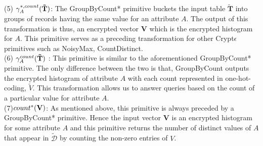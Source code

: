 (5) $\gamma^{*,count}_{A}(\mathbf{\tilde{T}})$: The  \textsf{GroupByCount*} primitive buckets the input table $\mathbf{\tilde{T}}$ into groups of records having the same value for an attribute $A$. The output of this transformation is thus, an encrypted  vector $\mathbf{V}$ which is the encrypted histogram for $A$.
    This primitive serves as a preceding transformation for other Crypt$\epsilon$ primitives such as \textsf{NoisyMax}, \textsf{CountDistinct}.\\
(6) $\gamma^{count}_{A}(\mathbf{\tilde{T}})$ : This primitive is similar to the aforementioned \textsf{GroupByCount*} primitive. The only difference between the two is that, \textsf{GroupByCount} outputs the encrypted histogram of attribute $A$ with each count represented in one-hot-coding, $\tilde{V}$.  This transformation allows us to answer queries based on the count of a particular value for attribute $A$.\\
(7)$count^*(\mathbf{V})$: As mentioned above, this primitive is always preceded by a \textsf{GroupByCount*} primitive. Hence the input vector $\mathbf{V}$ is an encrypted histogram for some attribute $A$ and this primitive returns the number of distinct values of $A$ that appear in  $\boldsymbol{\tilde{\mathcal{D}}}$ by counting the non-zero entries of $V$.\\

